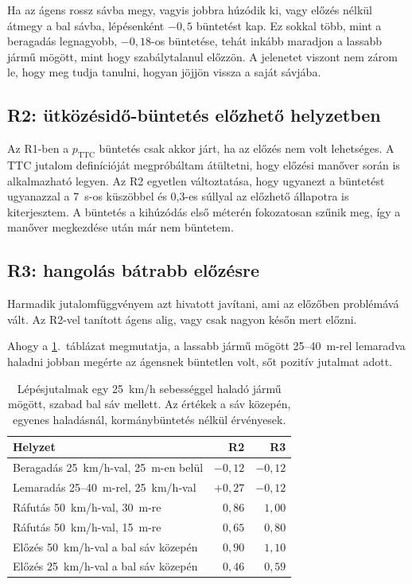 \documentclass[a4paper,12pt,oneside]{article}
\begin{document}
Ha az ágens rossz sávba megy, vagyis jobbra húzódik ki, vagy előzés nélkül átmegy a bal sávba,
lépésenként $-0{,}5$ büntetést kap. Ez sokkal több, mint a beragadás legnagyobb, $-0{,}18$-os
büntetése, tehát inkább maradjon a lassabb jármű mögött, mint hogy szabálytalanul előzzön. A jelenetet viszont nem
zárom le, hogy meg tudja tanulni, hogyan jöjjön vissza a saját sávjába.



\subsection{R2: ütközésidő-büntetés előzhető helyzetben}
\label{subsec:reward2}

Az R1-ben a $p_{\text{TTC}}$ 
büntetés csak akkor járt, ha az előzés nem volt lehetséges.
A TTC jutalom definícióját megpróbáltam átültetni, hogy előzési manőver során
is alkalmazható legyen. Az R2 egyetlen változtatása,
hogy ugyanezt a büntetést ugyanazzal a 7~s-os küszöbbel és 0,3-es súllyal az előzhető állapotra is kiterjesztem.
A büntetés a kihúzódás első méterén fokozatosan szűnik meg, így a manőver megkezdése után már nem büntetem.

\subsection{R3: hangolás bátrabb előzésre}
\label{subsec:reward3}

Harmadik jutalomfüggvényem azt hivatott javítani, ami az előzőben problémává vált.
Az R2-vel tanított ágens alig, vagy csak nagyon későn mert előzni. 

Ahogy a \ref{tab:reward_steps}.~táblázat
megmutatja, a lassabb jármű mögött 25--40~m-rel lemaradva haladni jobban megérte az ágensnek
büntetlen volt, sőt pozitív jutalmat adott. 
\begin{table}[htbp]
  \centering
  \caption{Lépésjutalmak egy 25~km/h sebességgel haladó jármű mögött, szabad bal sáv
           mellett. Az értékek a sáv közepén, egyenes haladásnál, kormánybüntetés
           nélkül érvényesek.}
  \label{tab:reward_steps}
  \begin{tabular}{lrr}
    \toprule
    Helyzet & R2 & R3 \\
    \midrule
    Beragadás 25~km/h-val, 25~m-en belül & $-0{,}12$ & $-0{,}12$ \\
    Lemaradás 25--40~m-rel, 25~km/h-val & $+0{,}27$ & $-0{,}12$ \\
    Ráfutás 50~km/h-val, 30~m-re        & $0{,}86$ & $1{,}00$ \\
    Ráfutás 50~km/h-val, 15~m-re        & $0{,}65$ & $0{,}80$ \\
    Előzés 50~km/h-val a bal sáv közepén & $0{,}90$ & $1{,}10$ \\
    Előzés 25~km/h-val a bal sáv közepén & $0{,}46$ & $0{,}59$ \\
    \bottomrule
  \end{tabular}
\end{table}
\end{document}
